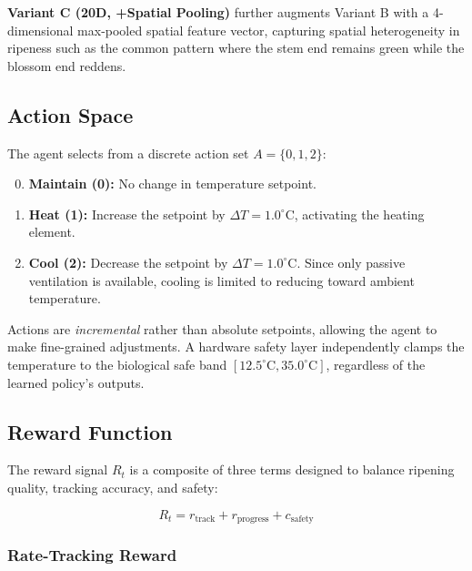     \textbf{Variant C (20D, +Spatial Pooling)} further augments Variant B with a 4-dimensional max-pooled spatial feature vector, capturing spatial heterogeneity in ripeness such as the common pattern where the stem end remains green while the blossom end reddens.

    \subsection{Action Space}

    The agent selects from a discrete action set $A = \{0, 1, 2\}$:

    \begin{enumerate}
        \setcounter{enumi}{-1}
        \item \textbf{Maintain (0):} No change in temperature setpoint.
        \item \textbf{Heat (1):} Increase the setpoint by $\Delta T = 1.0^{\circ}$C, activating the heating element.
        \item \textbf{Cool (2):} Decrease the setpoint by $\Delta T = 1.0^{\circ}$C. Since only passive ventilation is available, cooling is limited to reducing toward ambient temperature.
    \end{enumerate}

    Actions are \emph{incremental} rather than absolute setpoints, allowing the agent to make fine-grained adjustments. A hardware safety layer independently clamps the temperature to the biological safe band $[12.5^{\circ}\text{C}, 35.0^{\circ}\text{C}]$, regardless of the learned policy's outputs.

    \subsection{Reward Function}
        \label{subsec:reward}

    The reward signal $R_t$ is a composite of three terms designed to balance ripening quality, tracking accuracy, and safety:

    \begin{equation}
        R_t = r_{\text{track}} + r_{\text{progress}} + c_{\text{safety}}
        \label{eq:reward}
    \end{equation}

    \subsubsection{Rate-Tracking Reward}

